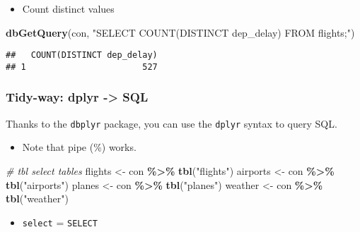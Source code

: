 \documentclass[
]{book}
\newenvironment{Shaded}{\begin{snugshade}}{\end{snugshade}}
\newcommand{\CommentTok}[1]{\textcolor[rgb]{0.56,0.35,0.01}{\textit{#1}}}
\newcommand{\KeywordTok}[1]{\textcolor[rgb]{0.13,0.29,0.53}{\textbf{#1}}}
\newcommand{\NormalTok}[1]{#1}
\newcommand{\OperatorTok}[1]{\textcolor[rgb]{0.81,0.36,0.00}{\textbf{#1}}}
\newcommand{\StringTok}[1]{\textcolor[rgb]{0.31,0.60,0.02}{#1}}
\providecommand{\tightlist}{%
  \setlength{\itemsep}{0pt}\setlength{\parskip}{0pt}}
\begin{document}
\begin{itemize}
\tightlist
\item
  Count distinct values
\end{itemize}

\begin{Shaded}
\begin{Highlighting}[]
\KeywordTok{dbGetQuery}\NormalTok{(con, }
           \StringTok{"SELECT COUNT(DISTINCT dep\_delay)}
\StringTok{           FROM flights;"}\NormalTok{)}
\end{Highlighting}
\end{Shaded}

\begin{verbatim}
##   COUNT(DISTINCT dep_delay)
## 1                       527
\end{verbatim}

\hypertarget{tidy-way-dplyr---sql}{%
\subsubsection{Tidy-way: dplyr -\textgreater{} SQL}\label{tidy-way-dplyr---sql}}

Thanks to the \texttt{dbplyr} package, you can use the \texttt{dplyr} syntax to query SQL.

\begin{itemize}
\tightlist
\item
  Note that pipe (\%) works.
\end{itemize}

\begin{Shaded}
\begin{Highlighting}[]
\CommentTok{\# tbl select tables}
\NormalTok{flights \textless{}{-}}\StringTok{ }\NormalTok{con }\OperatorTok{\%\textgreater{}\%}\StringTok{ }\KeywordTok{tbl}\NormalTok{(}\StringTok{"flights"}\NormalTok{)}
\NormalTok{airports \textless{}{-}}\StringTok{ }\NormalTok{con }\OperatorTok{\%\textgreater{}\%}\StringTok{ }\KeywordTok{tbl}\NormalTok{(}\StringTok{"airports"}\NormalTok{)}
\NormalTok{planes \textless{}{-}}\StringTok{ }\NormalTok{con }\OperatorTok{\%\textgreater{}\%}\StringTok{ }\KeywordTok{tbl}\NormalTok{(}\StringTok{"planes"}\NormalTok{)}
\NormalTok{weather \textless{}{-}}\StringTok{ }\NormalTok{con }\OperatorTok{\%\textgreater{}\%}\StringTok{ }\KeywordTok{tbl}\NormalTok{(}\StringTok{"weather"}\NormalTok{)}
\end{Highlighting}
\end{Shaded}

\begin{itemize}
\tightlist
\item
  \texttt{select} = \texttt{SELECT}
\end{itemize}
\end{document}
